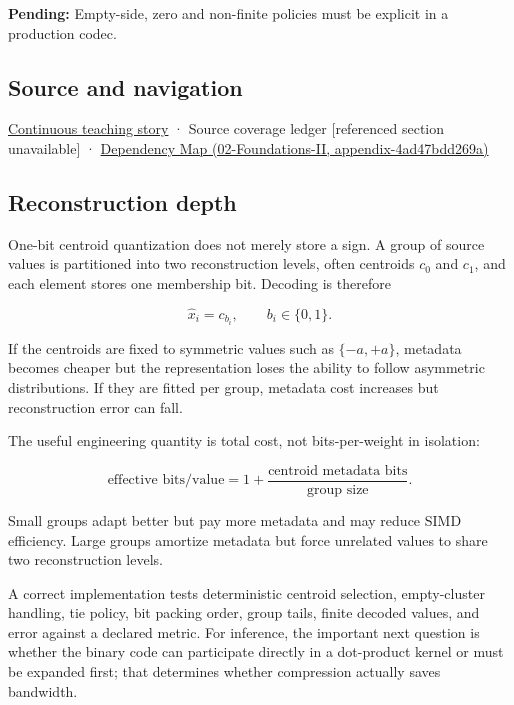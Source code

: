 \textbf{Pending:} Empty-side, zero and non-finite policies must be explicit in a production codec.

\subsection{Source and navigation}\label{appendix-4ccd7a775813-source-and-navigation}

\hyperref[01-foundations-i-ch001-choosing-what-information-to-keep]{Continuous teaching story} · {Source coverage ledger {[}referenced section unavailable{]}} · \href{../02-Foundations-II/main.pdf\#nameddest=appendix-4ad47bdd269a}{Dependency Map (02-Foundations-II, appendix-4ad47bdd269a)}

\subsection{Reconstruction depth}\label{appendix-4ccd7a775813-reconstruction-depth}

One-bit centroid quantization does not merely store a sign. A group of source values is partitioned into two reconstruction levels, often centroids \(c_0\) and \(c_1\), and each element stores one membership bit. Decoding is therefore

\[
\hat x_i = c_{b_i},
\qquad b_i\in\{0,1\}.
\]

If the centroids are fixed to symmetric values such as \(\{-a,+a\}\), metadata becomes cheaper but the representation loses the ability to follow asymmetric distributions. If they are fitted per group, metadata cost increases but reconstruction error can fall.

The useful engineering quantity is total cost, not bits-per-weight in isolation:

\[
\text{effective bits/value}
=
1 + \frac{\text{centroid metadata bits}}{\text{group size}}.
\]

Small groups adapt better but pay more metadata and may reduce SIMD efficiency. Large groups amortize metadata but force unrelated values to share two reconstruction levels.

A correct implementation tests deterministic centroid selection, empty-cluster handling, tie policy, bit packing order, group tails, finite decoded values, and error against a declared metric. For inference, the important next question is whether the binary code can participate directly in a dot-product kernel or must be expanded first; that determines whether compression actually saves bandwidth.
